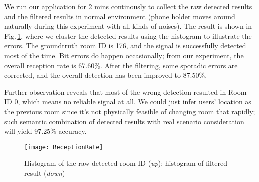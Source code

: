 We run our application for 2 mins continously to collect the raw detected results and the filtered results in normal environment (phone holder moves around naturally during this experiment with all kinds of noises). The result is shown in Fig.\,\ref{fig:reception}, where we cluster the detected results using the histogram to illustrate the errors. The groundtruth room ID is 176, and the signal is successfully detected most of the time. Bit errors do happen occasionally; from our experiment, the overall reception rate is 67.60\%. After the filtering, some sporadic errors are corrected, and the overall detection has been improved to 87.50\%. 

Further observation reveals that most of the wrong detection resulted in Room ID 0, which means no reliable signal at all. We could just infer users' location as the previous room since it's not physically feasible of changing room that rapidly; such semantic combination of detected results with real scenario consideration will yield 97.25\% accuracy.

\begin{figure}
  \centering
  \texttt{[image: ReceptionRate]}
  \caption{Histogram of the raw detected room ID ({\em up}); histogram of filtered result ({\em down})}
  \vspace{-0.3cm}
  \label{fig:reception}
\end{figure}




